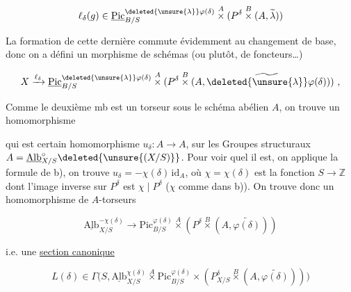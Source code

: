 
\[
\ell_\delta(g)\in\underline{\mathrm{Pic}}^{\deleted{\unsure{\lambda}}\varphi(\delta)}_{B/S}
\overset{A}{\times}(P^\delta\overset{B}{\times}(A,\widetilde\lambda))
\]

La formation de cette dernière commute évidemment au changement de base, donc on a défini un morphisme de schémas (ou plutôt, de foncteurs\ldots)

\[
X\xrightarrow{\ell_\delta}\underline{\mathrm{Pic}}_{B/S}^{\deleted{\unsure{\lambda}}\varphi(\delta)}
\overset{A}{\times}(P^\delta\overset{B}{\times}(A,\widetilde{\deleted{\unsure{\lambda}}\varphi(\delta)}))\ , 
\]


Comme le deuxième mb est un torseur sous le schéma abélien $A$, on trouve  un homomorphisme


qui est   certain homomorphisme $u_\delta:A\longrightarrow A$, sur les Groupes structuraux $A=\underline{\mathrm{Alb}}^\circ_{X/S}\deleted{\unsure{(X/S)}}$. Pour voir quel il est, on applique la formule \inserted{$(*)$} de b), on trouve $u_\delta=-\chi(\delta)\,\mathrm{id}_A$, où $\chi=\chi(\delta)$ est la fonction $S\longrightarrow\mathbb Z$ dont l'image inverse sur $P^\delta$ est $\chi\mid P^\delta$ ($\chi$ comme dans b)). On trouve donc un  homomorphisme de $A$-torseurs


\[
\underline{\mathrm{Alb}}^{-\chi(\delta)}_{X/S}\longrightarrow
\mathrm{Pic}^{\varphi(\delta)}_{B/S}\overset{A}{\times}
(P^\delta\overset B\times(A,\widetilde{\varphi(\delta)}))
\]

i.e. une \uline{section canonique}

\[
\boxed{L(\delta)\in\Gamma\bigl(S,\underline{\mathrm{Alb}}^{\chi(\delta)}_{X/S}
\overset A\times\mathrm{Pic}_{B/S}^{\varphi(\delta)}\times
(P^\delta_{X/S}\overset B\times(A,\widetilde{\varphi(\delta)}))\bigr)}
\]
